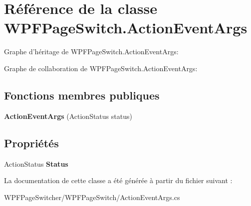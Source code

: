 \hypertarget{class_w_p_f_page_switch_1_1_action_event_args}{\section{Référence de la classe W\+P\+F\+Page\+Switch.\+Action\+Event\+Args}
\label{class_w_p_f_page_switch_1_1_action_event_args}
}


Graphe d'héritage de W\+P\+F\+Page\+Switch.\+Action\+Event\+Args\+:


Graphe de collaboration de W\+P\+F\+Page\+Switch.\+Action\+Event\+Args\+:
\subsection*{Fonctions membres publiques}
\begin{DoxyCompactItemize}
\item 
\hypertarget{class_w_p_f_page_switch_1_1_action_event_args_a3b996d76963affa1c411cf2ed947e45b}{{\bfseries Action\+Event\+Args} (Action\+Status status)}\label{class_w_p_f_page_switch_1_1_action_event_args_a3b996d76963affa1c411cf2ed947e45b}

\end{DoxyCompactItemize}
\subsection*{Propriétés}
\begin{DoxyCompactItemize}
\item 
\hypertarget{class_w_p_f_page_switch_1_1_action_event_args_a76d9c3d60f925d47a92cce2f247255b8}{Action\+Status {\bfseries Status}}\label{class_w_p_f_page_switch_1_1_action_event_args_a76d9c3d60f925d47a92cce2f247255b8}

\end{DoxyCompactItemize}


La documentation de cette classe a été générée à partir du fichier suivant \+:\begin{DoxyCompactItemize}
\item 
W\+P\+F\+Page\+Switcher/\+W\+P\+F\+Page\+Switch/Action\+Event\+Args.\+cs\end{DoxyCompactItemize}
